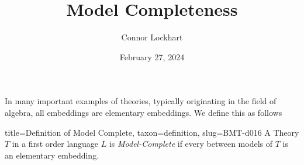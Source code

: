 \documentclass[a4paper]{article}
\title{Model Completeness}
\date{February 27, 2024}
\author{Connor Lockhart}
\begin{document}
\maketitle
\par{In many important examples of theories, typically originating in the field of algebra, all embeddings are elementary embeddings. We define this as follows}
\begin{tree}{title={Definition of Model Complete}, taxon={definition}, slug={BMT-d016}}
A Theory \(T\) in a first order language \(L\) is \emph{Model-Complete} if  every  between models of \(T\) is an elementary embedding. 
\end{tree}

\printbibliography
\end{document}
